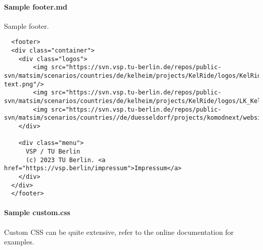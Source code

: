 \paragraph{Sample footer.md}
Sample footer.

\begin{lstlisting}
  <footer>
  <div class="container">
    <div class="logos">
        <img src="https://svn.vsp.tu-berlin.de/repos/public-svn/matsim/scenarios/countries/de/kelheim/projects/KelRide/logos/KelRide-text.png"/>
        <img src="https://svn.vsp.tu-berlin.de/repos/public-svn/matsim/scenarios/countries/de/kelheim/projects/KelRide/logos/LK_Kelheim.png"/>
        <img src="https://svn.vsp.tu-berlin.de/repos/public-svn/matsim/scenarios/countries//de/duesseldorf/projects/komodnext/website/logos/TU.svg"/>
    </div>

    <div class="menu">
      VSP / TU Berlin
      (c) 2023 TU Berlin. <a href="https://vsp.berlin/impressum">Impressum</a>
    </div>
  </div>
  </footer>

\end{lstlisting}

\paragraph{Sample custom.css}

Custom CSS can be quite extensive, refer to the online documentation for examples.

